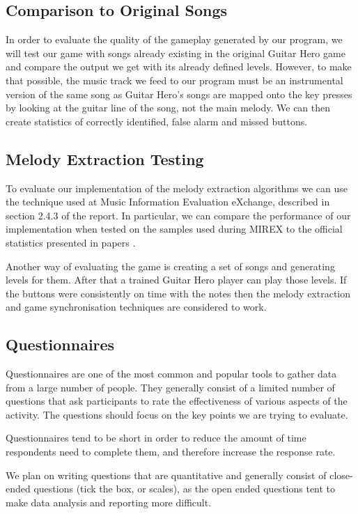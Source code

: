 \subsection{Comparison to Original Songs}
In order to evaluate the quality of the gameplay generated by our program, we will test our game with songs already existing in the original Guitar Hero game and compare the output we get with its already defined levels. However, to make that possible, the music track we feed to our program must be an instrumental version of the same song as Guitar Hero's songs are mapped onto the key presses by looking at the guitar line of the song, not the main melody. We can then create statistics of correctly identified, false alarm and missed buttons.

\subsection{Melody Extraction Testing}
To evaluate our implementation of the melody extraction algorithms we can use the technique used at Music Information Evaluation eXchange, described in section 2.4.3 of the report. In particular, we can compare the performance of our implementation when tested on the samples used during MIREX to the official statistics presented in papers \cite{salamon, comparison}.

Another way of evaluating the game is creating a set of songs and generating levels for them. After that a trained Guitar Hero player can play those levels. If the buttons were consistently on time with the notes then the melody extraction and game synchronisation techniques are considered to work.

\subsection{Questionnaires}
Questionnaires are one of the most common and popular tools to gather data from a large number of people. They generally consist of a limited number of questions that ask participants to rate the effectiveness of various aspects of the activity. The questions should focus on the key points we are trying to evaluate. 

Questionnaires tend to be short in order to reduce the amount of time respondents need to complete them, and therefore increase the response rate. 

We plan on writing questions that are quantitative and generally consist of close-ended questions (tick the box, or scales), as the open ended questions tent to make data analysis and reporting more difficult.